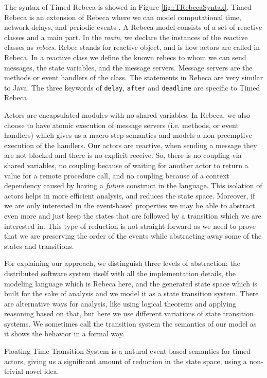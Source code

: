 The syntax of Timed Rebeca is showed in Figure \ref{fig::TRebecaSyntax}.
Timed Rebeca is an extension of Rebeca where we can model computational time, network delays, and periodic events \cite{DBLP:journals/scp/ReynissonSACJIS14,DBLP:conf/birthday/SirjaniK16}.
%
A Rebeca model consists of a set of reactive classes and a main part. In the \textit{main}, we declare the instances of the reactive classes as \textit{rebecs}. Rebec stands for reactive object, and is how actors are called in Rebeca. In a reactive class we define the known rebecs to whom we can send messages, the state variables, and the message servers. Message servers are the methods or event handlers of the class. The statements in Rebeca are very similar to Java.
The three keywords of \texttt{delay}, \texttt{after} and \texttt{deadline} are specific to Timed Rebeca.


Actors are encapsulated modules with no shared variables. In Rebeca, we also choose to have atomic execution of message servers (i.e. methods, or event handlers) which gives us a macro-step semantics and models a non-preemptive execution of the handlers.
Our actors are reactive, when sending a message they are not blocked and there is no explicit receive. So, there is no coupling via shared variables, no coupling because of waiting for another actor to return a value for a remote procedure call, and no coupling because of a context dependency caused by having a \textit{future}  construct in the language.
This isolation of actors helps in more efficient analysis, and reduces the state space.
Moreover, if we are only interested in the event-based properties we may be able to abstract even more and just keep the states that are followed by a transition which we are interested in. This type of reduction is not straight forward as we need to prove that we are preserving the order of the events while abstracting away some of the states and transitions. 

For explaining our approach, we distinguish three levels of abstraction: the distributed software system itself with all the implementation details, the modeling language which is Rebeca here, and the generated state space which is built for the sake of analysis and  we model it as a state transition system. There are alternative ways for analysis, like using logical theorems and applying reasoning based on that, but here we use different variations of state transition systems.
We sometimes call the transition system the semantics of our model as it shows the behavior in a formal way.



Floating Time Transition System is a natural event-based semantics for timed actors, giving us a significant amount of reduction in the state space, using a non-trivial novel idea.
	